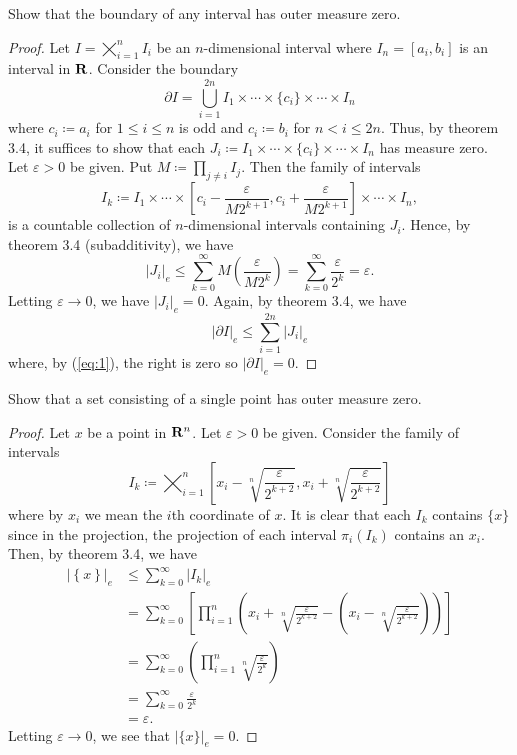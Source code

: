 \begin{problem}
Show that the boundary of any interval has outer measure zero.
\end{problem}
\begin{proof}
Let $I=\bigtimes_{i=1}^nI_i$ be an $n$-dimensional interval where
$I_n=[a_i,b_i]$ is an interval in $\mathbf{R}$. Consider the boundary
\[
\partial I=
\bigcup_{i=1}^{2n}I_1\times\cdots\times\{c_i\}\times\cdots\times
  I_n
\]
where $c_i\coloneqq a_i$ for $1\leq i\leq n$ is odd and $c_i\coloneqq b_i$
for $n<i\leq 2n$. Thus, by theorem 3.4, it suffices to show that each
$J_i\coloneqq I_1\times\cdots\times\{c_i\}\times\cdots\times I_n$ has
measure zero. Let
$\varepsilon>0$ be given. Put $M\coloneqq\prod_{j\neq i}I_j$. Then the
family of intervals
\[
I_k\coloneqq
I_1\times\cdots\times
\left[
c_i-\frac{\varepsilon}{M2^{k+1}},
c_i+\frac{\varepsilon}{M2^{k+1}}
\right]
\times
\cdots
\times I_n,
\]
is a countable collection of $n$-dimensional intervals containing
$J_i$. Hence, by theorem 3.4 (subadditivity), we have
\begin{equation}
\label{eq:1}
\left|J_i\right|_e\leq
\sum_{k=0}^\infty M\left(\frac{\varepsilon}{M2^k}\right)=
\sum_{k=0}^\infty \frac{\varepsilon}{2^k}=\varepsilon.
\end{equation}
Letting $\varepsilon\to 0$, we have $\left|J_i\right|_e=0$. Again, by
theorem 3.4, we have
\[
\left|\partial I\right|_e
\leq\sum_{i=1}^{2n}\left|J_i\right|_e
\]
where, by (\ref{eq:1}), the right is zero so $\left|\partial
  I\right|_e=0$.
\end{proof}
\newpage

\begin{problem}
Show that a set consisting of a single point has outer measure zero.
\end{problem}
\begin{proof}
Let $x$ be a point in $\mathbf{R}^n$. Let $\varepsilon>0$ be given. Consider the
family of intervals
\[
I_k\coloneqq
\bigtimes_{i=1}^n\left[x_i-\sqrt[n]{\frac{\varepsilon}{2^{k+2}}},
                      x_i+\sqrt[n]{\frac{\varepsilon}{2^{k+2}}}\right]
\]
where by $x_i$ we mean the $i$th coordinate of $x$. It is clear that each
$I_k$ contains $\{x\}$ since in the projection, the projection of each
interval $\pi_i(I_k)$ contains an $x_i$. Then, by theorem 3.4, we have
\begin{align*}
\left|\left\{x\right\}\right|_e
&\leq\sum_{k=0}^\infty\left|I_k\right|_e\\
&=\sum_{k=0}^\infty\left[
  \prod_{i=1}^n\left(x_i+\sqrt[n]{\frac{\varepsilon}{2^{k+2}}}
  -\left(x_i-\sqrt[n]{\frac{\varepsilon}{2^{k+2}}}\right)
  \right)\right]\\
&=\sum_{k=0}^\infty\left(\prod_{i=1}^n\sqrt[n]{\frac{\varepsilon}{2^k}}\right)\\
&=\sum_{k=0}^\infty\frac{\varepsilon}{2^k}\\
&=\varepsilon.
\end{align*}
Letting $\varepsilon\to 0$, we see that $\left|\{x\}\right|_e=0$.
\end{proof}

